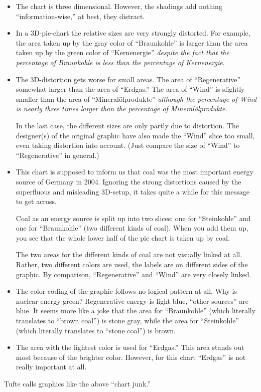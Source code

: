 \begin{itemize}
\item
  The chart is three dimensional. However, the shadings add
  nothing ``information-wise,'' at best, they distract.
\item
  In a 3D-pie-chart the relative sizes are very strongly
  distorted. For example, the area taken up by the gray color of ``Braunkohle''
  is larger than the area taken up by the green color of
  ``Kernenergie'' \emph{despite the fact that the percentage of
    Braunkohle is less than the percentage of Kernenergie}.
\item
  The 3D-distortion gets worse for small areas. The area of
  ``Regenerative'' somewhat larger  than the area of ``Erdgas.''  
  The area of ``Wind'' is slightly smaller than the area of
  ``Mineral\"olprodukte'' \emph{although the percentage of Wind is
    nearly three times larger than the percentage of
    Mineral\"olprodukte.}

  In the last case, the different sizes are only partly due to
  distortion. The designer(s) of the original graphic have also made
  the ``Wind'' slice too small, even taking distortion into
  account. (Just compare the size of ``Wind'' to ``Regenerative'' in
  general.) 
\item
  This chart is supposed to inform us that coal was the most important
  energy source of Germany in 2004. Ignoring the strong distortions
  caused by the superfluous and misleading 3D-setup, it takes quite a
  while for this message to get across.

  Coal as an energy source is split up into two slices: one for
  ``Steinkohle'' and one for ``Braunkohle'' (two different kinds of
  coal). When you add them up, you see that the whole lower half of
  the pie chart is taken up by coal.

  The two areas for the different kinds of coal are not visually
  linked at all. Rather, two different colors are used, the labels are
  on different sides of the graphic. By comparison, ``Regenerative''
  and ``Wind'' are very closely linked.
\item
  The color coding of the graphic follows no logical pattern at
  all. Why is nuclear energy green? Regenerative energy is light blue,
  ``other sources'' are blue. It seems more like a joke that the area
  for ``Braunkohle'' (which literally translates to ``brown coal'') is
  stone gray, while the area for ``Steinkohle'' (which literally
  translates to ``stone coal'') is brown.
\item
  The area with the lightest color is used for ``Erdgas.'' This area
  stands out most because of the brighter color. However, for this
  chart ``Erdgas'' is not really important at all.
\end{itemize}
Tufte calls graphics like the above ``chart junk.'' 

